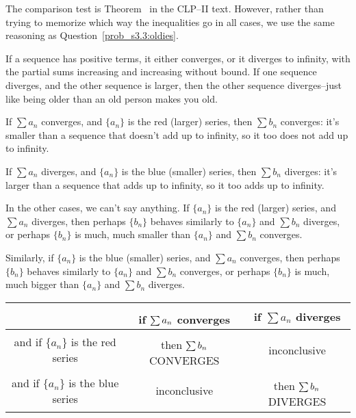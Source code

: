 \begin{solution}
The comparison test is Theorem~ in the CLP--II text. However, rather than trying to memorize which way the inequalities go in all cases, we  use the same reasoning as Question~\ref{prob_s3.3:oldies}.

If a sequence has positive terms, it either converges, or it diverges to infinity, with the partial sums increasing and increasing without bound. If one sequence diverges, and the other sequence is larger, then the other sequence diverges--just like being older than an old person makes you old.

If $\sum a_n$ converges, and $\{a_n\}$ is the red (larger) series, then $\sum b_n$ converges: it's smaller than a sequence that doesn't add up to infinity, so it too does not add up to infinity.

If $\sum a_n$ diverges, and $\{a_n\}$ is the blue (smaller) series, then $\sum b_n$ diverges: it's larger than a sequence that adds up to infinity, so it too adds up to infinity.

In the other cases, we can't say anything. If $\{a_n\}$ is the red (larger) series, and  $\sum a_n$ diverges, then perhaps $\{b_n\}$ behaves similarly to $\{a_n\}$ and $\sum b_n$ diverges, or perhaps $\{b_n\}$ is much, much smaller than $\{a_n\}$ and $\sum b_n$ converges.

Similarly, if $\{a_n\}$ is the blue (smaller) series, and  $\sum a_n$ converges, then perhaps $\{b_n\}$ behaves similarly to $\{a_n\}$ and $\sum b_n$ converges, or perhaps $\{b_n\}$ is much, much bigger than $\{a_n\}$ and $\sum b_n$ diverges.

\begin{center}
\begin{tabular}{|c|c|c|}
\hline
& if $\sum\limits^{\vphantom{\frac12}} a_n$ converges & if $\sum a_n$ diverges\\[10pt]
\hline
\color{red} and if $\{a_n\}$ is the red series& \color{blue}then $\sum\limits^{\vphantom{\frac12}} b_n$ CONVERGES&inconclusive \\[10pt]
\hline
\color{blue} and if $\{a_n\}$ is the blue series&inconclusive& \color{red}then $\sum\limits^{\vphantom{\frac12}} b_n$ DIVERGES\\[10pt]
\hline
\end{tabular}
\end{center}
\end{solution}

